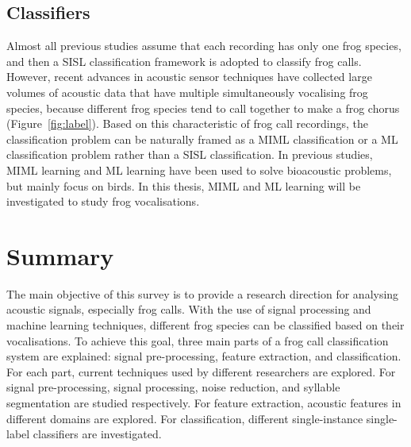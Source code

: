 \subsection{Classifiers}
Almost all previous studies assume that each recording has only one frog species, and then a SISL classification framework is adopted to classify frog calls. However, recent advances in acoustic sensor techniques have collected large volumes of acoustic data that have multiple simultaneously vocalising frog species, because different frog species tend to call together to make a frog chorus (Figure~\ref{fig:label}). Based on this characteristic of frog call recordings, the classification problem can be naturally framed as a MIML classification or a ML classification problem rather than a SISL classification.
In previous studies, MIML learning and ML learning have been used to solve bioacoustic problems, but mainly focus on birds. In this thesis, MIML and ML learning will be investigated to study frog vocalisations.





\section{Summary}
\label{conclusion}
The main objective of this survey is to provide a research direction for analysing acoustic signals, especially frog calls. With the use of signal processing and machine learning techniques, different frog species can be classified based on their vocalisations. To achieve this goal, three main parts of a frog call classification system are explained: signal pre-processing, feature extraction, and classification. For each part, current techniques used by different researchers are explored. For signal pre-processing, signal processing, noise reduction, and syllable segmentation are studied respectively. For feature extraction, acoustic features in different domains are explored. For classification, different single-instance single-label classifiers are investigated. 

